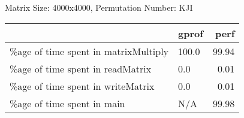 \documentclass{article}
\begin{document}
    Matrix Size: 4000x4000, Permutation Number: KJI \\
    \begin{tabular}{llr}
\hline
                                      & gprof   &   perf \\
\hline
 \%age of time spent in matrixMultiply & 100.0   &  99.94 \\
 \%age of time spent in readMatrix     & 0.0     &   0.01 \\
 \%age of time spent in writeMatrix    & 0.0     &   0.01 \\
 \%age of time spent in main           & N/A     &  99.98 \\
\hline
\end{tabular}
    
\end{document}
